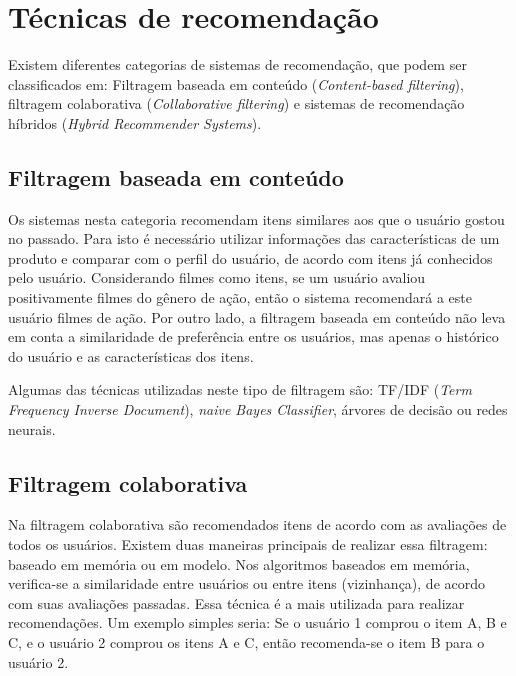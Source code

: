 \documentclass[12pt,a4paper,header]{abnt}
\begin{document}
\section{Técnicas de recomendação}

Existem diferentes categorias de sistemas de recomendação, que podem ser classificados em: Filtragem baseada em conteúdo (\textit{Content-based filtering}), filtragem colaborativa (\textit{Collaborative filtering}) e sistemas de recomendação híbridos (\textit{Hybrid Recommender Systems})\cite{melville2011recommender}.

\subsection{Filtragem baseada em conteúdo}

Os sistemas nesta categoria recomendam itens similares aos que o usuário gostou no passado\cite{gorakala2015building}. Para isto é necessário utilizar informações das características de um produto\cite{shapira2011recommender} e comparar com o perfil do usuário, de acordo com itens já conhecidos pelo usuário. Considerando filmes como itens, se um usuário avaliou positivamente filmes do gênero de ação, então o sistema recomendará a este usuário filmes de ação. Por outro lado, a filtragem baseada em conteúdo não leva em conta a similaridade de preferência entre os usuários, mas apenas o histórico do usuário e as características dos itens\cite{gorakala2015building}.

Algumas das técnicas utilizadas neste tipo de filtragem são: TF/IDF (\textit{Term Frequency Inverse Document}), \textit{naive Bayes Classifier}, árvores de decisão ou redes neurais\cite{isinkaye2015recommendation}. 

\subsection{Filtragem colaborativa}

Na filtragem colaborativa são recomendados itens de acordo com as avaliações de todos os usuários\cite{melville2011recommender}. Existem duas maneiras principais de realizar essa filtragem: baseado em memória ou em modelo\cite{dakhel2011new}. Nos algoritmos baseados em memória, verifica-se a similaridade entre usuários ou entre itens (vizinhança), de acordo com suas avaliações passadas. Essa técnica é a mais utilizada para realizar recomendações\cite{shapira2011recommender}. Um exemplo simples seria: Se o usuário 1 comprou o item A, B e C, e o usuário 2 comprou os itens A e C, então recomenda-se o item B para o usuário 2.
\end{document}
